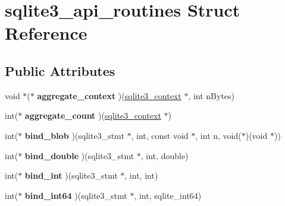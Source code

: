 \hypertarget{structsqlite3__api__routines}{\section{sqlite3\-\_\-api\-\_\-routines Struct Reference}
\label{structsqlite3__api__routines}
}
\subsection*{Public Attributes}
\begin{DoxyCompactItemize}
\item 
\hypertarget{structsqlite3__api__routines_a16fafb5f2460657f528338aee5f65d25}{void $\ast$($\ast$ {\bfseries aggregate\-\_\-context} )(\hyperlink{structsqlite3__context}{sqlite3\-\_\-context} $\ast$, int n\-Bytes)}\label{structsqlite3__api__routines_a16fafb5f2460657f528338aee5f65d25}

\item 
\hypertarget{structsqlite3__api__routines_a8373f7a5dd2d6f1c86bbf024b1796156}{int($\ast$ {\bfseries aggregate\-\_\-count} )(\hyperlink{structsqlite3__context}{sqlite3\-\_\-context} $\ast$)}\label{structsqlite3__api__routines_a8373f7a5dd2d6f1c86bbf024b1796156}

\item 
\hypertarget{structsqlite3__api__routines_afeb41d70ab5a221fec488560934c825b}{int($\ast$ {\bfseries bind\-\_\-blob} )(sqlite3\-\_\-stmt $\ast$, int, const void $\ast$, int n, void($\ast$)(void $\ast$))}\label{structsqlite3__api__routines_afeb41d70ab5a221fec488560934c825b}

\item 
\hypertarget{structsqlite3__api__routines_aca43a229ce28397ba8c18a4d6e03e40c}{int($\ast$ {\bfseries bind\-\_\-double} )(sqlite3\-\_\-stmt $\ast$, int, double)}\label{structsqlite3__api__routines_aca43a229ce28397ba8c18a4d6e03e40c}

\item 
\hypertarget{structsqlite3__api__routines_a6fef49e6c9c1fa573c55cc6668a8448f}{int($\ast$ {\bfseries bind\-\_\-int} )(sqlite3\-\_\-stmt $\ast$, int, int)}\label{structsqlite3__api__routines_a6fef49e6c9c1fa573c55cc6668a8448f}

\item 
\hypertarget{structsqlite3__api__routines_a489304cada65abca390da9b751da8800}{int($\ast$ {\bfseries bind\-\_\-int64} )(sqlite3\-\_\-stmt $\ast$, int, sqlite\-\_\-int64)}\label{structsqlite3__api__routines_a489304cada65abca390da9b751da8800}


\end{DoxyCompactItemize}

